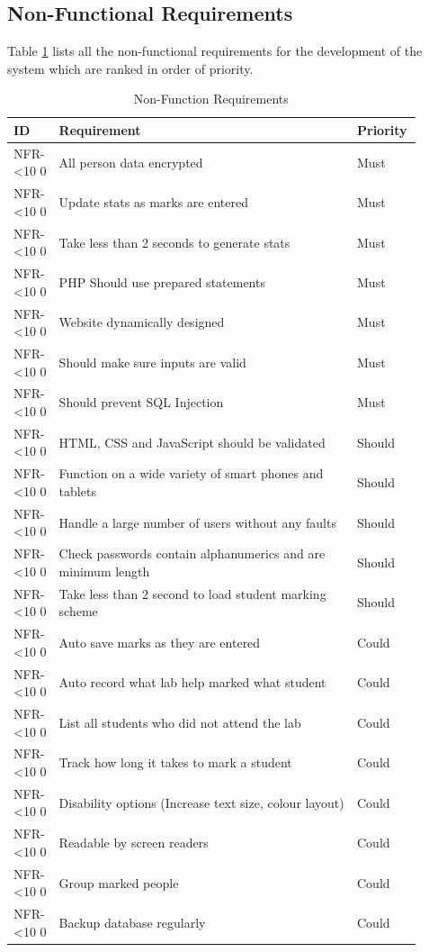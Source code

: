 \documentclass[11pt]{report}
\newcommand{\rid}[1]{\centering #1-\ifnum\value{requirement}<10 0\fi\arabic{requirement}
\stepcounter{requirement}}
\begin{document}
\newpage
\subsection{Non-Functional Requirements} \label{sec:non-func}

Table \ref{table:non-func} lists all the non-functional requirements for the development of the system which are ranked in order of priority.

\begin{spacing}{1.25}
\begin{longtable}{|p{0.1\linewidth}|p{0.7\linewidth}|p{0.1\linewidth}|}
\caption{Non-Function Requirements} \label{table:non-func}\\
\hline
\textbf{ID} & \textbf{Requirement} & \textbf{Priority}\\
\hline \hline


\rid{NFR} & All person data encrypted & Must\\ \hline
\rid{NFR} & Update stats as marks are entered & Must\\ \hline
\rid{NFR} & Take less than 2 seconds to generate stats  & Must\\ \hline
\rid{NFR} & PHP Should use prepared statements & Must\\ \hline
\rid{NFR} & Website dynamically designed & Must\\ \hline
\rid{NFR} & Should make sure inputs are valid & Must\\ \hline
\rid{NFR} & Should prevent SQL Injection & Must\\ \hline


\rid{NFR} & HTML, CSS and JavaScript should be validated & Should\\ \hline
\rid{NFR} & Function on a wide variety of smart phones and tablets & Should\\ \hline
\rid{NFR} & Handle a large number of users without any faults & Should\\ \hline
\rid{NFR} & Check passwords contain alphanumerics and are minimum length  & Should\\ \hline
\rid{NFR} & Take less than 2 second to load student marking scheme & Should\\ \hline


\rid{NFR} & Auto save marks as they are entered & Could\\ \hline
\rid{NFR} & Auto record what lab help marked what student & Could\\ \hline
\rid{NFR} & List all students who did not attend the lab & Could\\ \hline
\rid{NFR} & Track how long it takes to mark a student & Could \\ \hline
\rid{NFR} & Disability options (Increase text size, colour layout) & Could\\ \hline
\rid{NFR} & Readable by screen readers & Could\\ \hline
\rid{NFR} & Group marked people & Could \\ \hline
\rid{NFR} & Backup database regularly & Could\\ \hline



\end{longtable}
\end{spacing}
\end{document}
